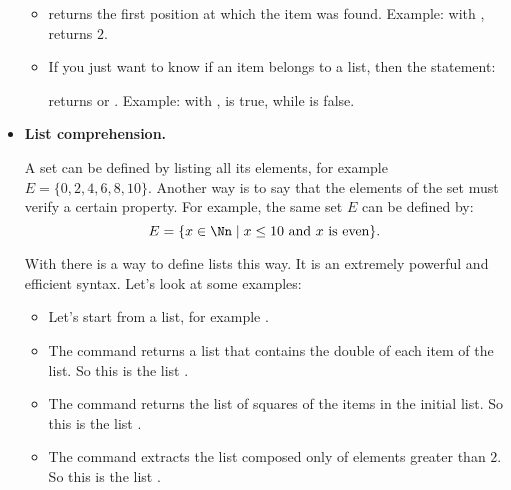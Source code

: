 \documentclass[11pt,class=report,crop=false]{standalone}
\begin{document}
\begin{cours}
\begin{itemize}
\begin{itemize}

    \item {}
    returns the first position at which the item was found. Example: with ,
    returns $2$.

  \item {} 
  If you just want to know if an item belongs to a list, then the statement:
  
  returns  or .
  Example: with ,
   \og{}\fg{} is true, while \og{}\fg{} is false.
  
\end{itemize}
   
  \item \textbf{List comprehension.}
  
  
  A set can be defined by listing all its elements, for example $E = \{0,2,4,6,8,10\}$. Another way is to say that the elements of the set must verify a certain property. For example, the same set $E$ can be defined by:
  $$E = \{ x \in \Nn \mid x \le 10 \text{ and } x \text{ is even} \}.$$
  
  With \Python{} there is a way to define lists this way. It is an extremely powerful and efficient syntax. Let's look at some examples:
  \begin{itemize}
    \item Let's start from a list, for example .
    
    \item The command  returns a list that contains the double of each item of the  list. So this is the list \ci{[2,4,6,8,...]}.
    
    \item The command  returns the list of squares of the items in the initial list. So this is the list \ci{[1,4,9,16,...]}.
    
    \item The command 
    extracts the list composed only of elements greater than $2$. So this is the list \ci{[3,4,5,6,7,6,5,4,3]}.
	\end{itemize}
	

\end{itemize}
\end{cours}
\end{document}
